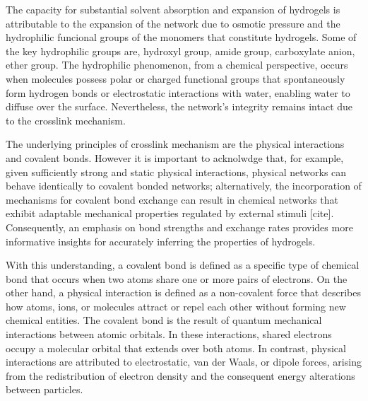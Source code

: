 The capacity for substantial solvent absorption and expansion of hydrogels is attributable to the expansion of the network due to osmotic pressure and the hydrophilic funcional groups of the monomers that constitute hydrogels.
Some of the key hydrophilic groups are,
    hydroxyl group,
    amide group,
    carboxylate anion,
    ether group.
The hydrophilic phenomenon, from a chemical perspective, occurs when molecules possess polar or charged functional groups that spontaneously form hydrogen bonds or electrostatic interactions with water, enabling water to diffuse over the surface.
Nevertheless, the network's integrity remains intact due to the crosslink mechanism\citep{lelePredictionsBoundWater1997}.

The underlying principles of crosslink mechanism are the physical interactions and covalent bonds.
However it is important to acknolwdge that, for example, given sufficiently strong and static physical interactions, physical networks can behave identically to covalent bonded networks; 
alternatively, the incorporation of mechanisms for covalent bond exchange can result in chemical networks that exhibit adaptable mechanical properties regulated by external stimuli [cite]. 
Consequently, an emphasis on bond strengths and exchange rates provides more informative insights for accurately inferring the properties of hydrogels\citep{priyaComprehensiveReviewHydrogel2024}.

With this understanding, a covalent bond is defined as a specific type of chemical bond that occurs when two atoms share one or more pairs of electrons. 
On the other hand, a physical interaction is defined as a non-covalent force that describes how atoms, ions, or molecules attract or repel each other without forming new chemical entities. 
The covalent bond is the result of quantum mechanical interactions between atomic orbitals.
In these interactions, shared electrons occupy a molecular orbital that extends over both atoms. 
In contrast, physical interactions are attributed to electrostatic, van der Waals, or dipole forces, arising from the redistribution of electron density and the consequent energy alterations between particles.

